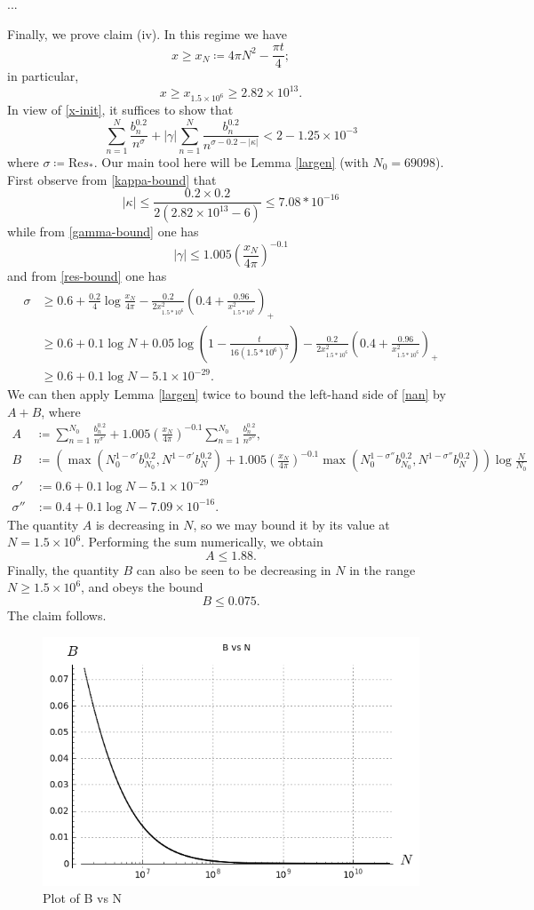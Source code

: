 ...


Finally, we prove claim (iv).  In this regime we have
$$ x \geq x_N \coloneqq 4\pi N^2 - \frac{\pi t}{4};$$
in particular,
$$ x \geq x_{1.5 \times 10^6} \geq  2.82 \times 10^{13}.$$
In view of \eqref{x-init}, it suffices to show that
\begin{equation}\label{nan}
 \sum_{n=1}^N \frac{b_n^{0.2}}{n^\sigma} + |\gamma| \sum_{n=1}^N \frac{b_n^{0.2}}{n^{\sigma-0.2-|\kappa|}}
< 2 - 1.25 \times 10^{-3}
\end{equation}
where $\sigma \coloneqq \mathrm{Re} s_*$.
Our main tool here will be Lemma \ref{largen} (with $N_0 = 69098$).  First observe from \eqref{kappa-bound} that
$$ |\kappa| \leq \frac{0.2 \times 0.2}{2(2.82 \times 10^{13}-6)} \leq 7.08 * 10^{-16}$$
while from \eqref{gamma-bound} one has
$$
|\gamma| \leq 1.005 \left( \frac{x_N}{4\pi} \right)^{-0.1}$$
and from \eqref{res-bound} one has
\begin{align*}
\sigma &\geq 0.6 + \frac{0.2}{4} \log \frac{x_N}{4\pi} - \frac{0.2}{2x_{1.5*10^6}^2} \left(0.4+\frac{0.96}{x_{1.5*10^6}^2}\right)_+ \\
&\geq 0.6 + 0.1 \log N + 0.05 \log \left(1 - \frac{t}{16 (1.5*10^6)^2}\right) - \frac{0.2}{2x_{1.5*10^6}^2} \left(0.4+\frac{0.96}{x_{1.5*10^6}^2}\right)_+ \\
&\geq 0.6 + 0.1 \log N - 5.1 \times 10^{-29}.
\end{align*}
We can then apply Lemma \ref{largen} twice to bound the left-hand side of \eqref{nan} by $A+B$, where
\begin{align*}
A &\coloneqq \sum_{n=1}^{N_0} \frac{b_n^{0.2}}{n^{\sigma'}} + 1.005 \left( \frac{x_N}{4\pi} \right)^{-0.1} \sum_{n=1}^{N_0} \frac{b_n^{0.2}}{n^{\sigma''}}, \\
B &\coloneqq (\max( N_0^{1-\sigma'} b_{N_0}^{0.2}, N^{1-\sigma'} b_N^{0.2} ) + 1.005 \left( \frac{x_N}{4\pi} \right)^{-0.1} 
\max( N_0^{1-\sigma''} b_{N_0}^{0.2}, N^{1-\sigma''} b_N^{0.2} ) )\log \frac{N}{N_0} \\
\sigma' &:= 0.6 + 0.1 \log N - 5.1 \times 10^{-29} \\
\sigma'' &:= 0.4 + 0.1 \log N - 7.09 \times 10^{-16}.
\end{align*}
The quantity $A$ is decreasing in $N$, so we may bound it by its value at $N = 1.5 \times 10^6$.  Performing the sum numerically, we obtain
$$ A \leq 1.88.$$
Finally, the quantity $B$ can also be seen to be decreasing in $N$ in the range $N \geq 1.5 \times 10^6$, and obeys the bound
$$ B \leq 0.075.$$
The claim follows.

\begin{figure}[h!]
  \includegraphics[width=0.7\linewidth]{B_vs_N.png}
  \caption{Plot of B vs N}
\end{figure}

